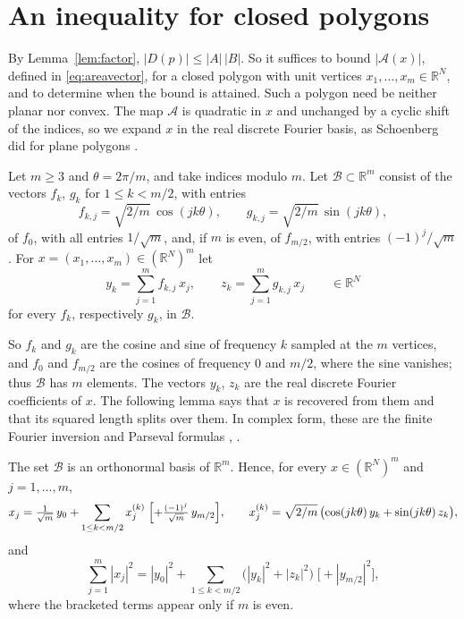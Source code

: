 \section{An inequality for closed polygons}
\label{sec:polygon}

By Lemma~\ref{lem:factor}, $|D(p)| \leq |A|\,|B|$. So it suffices to bound
$|\mathcal{A}(x)|$, defined in \eqref{eq:areavector}, for a closed polygon
with unit vertices $x_{1}, \ldots, x_{m} \in \mathbb{R}^{N}$, and to determine
when the bound is attained. Such a polygon need be neither planar nor convex.
The map $\mathcal{A}$ is quadratic in $x$ and unchanged by a cyclic shift of
the indices, so we expand $x$ in the real discrete Fourier basis, as
Schoenberg did for plane polygons \cite{schoenberg-1950}.

\begin{notation}
  Let $m \geq 3$ and $\theta = 2\pi/m$, and take indices modulo $m$. Let
  $\mathcal{B} \subset \mathbb{R}^{m}$ consist of the vectors $f_{k}$,
  $g_{k}$ for $1 \leq k < m/2$, with entries
  \[
    f_{k,j} = \sqrt{2/m}\,\cos(jk\theta), \qquad
    g_{k,j} = \sqrt{2/m}\,\sin(jk\theta),
  \]
  of $f_{0}$, with all entries $1/\sqrt{m}$, and, if $m$ is even, of
  $f_{m/2}$, with entries $(-1)^{j}/\sqrt{m}$. For $x = (x_{1}, \ldots,
  x_{m}) \in (\mathbb{R}^{N})^{m}$ let
  \[
    y_{k} = \sum_{j=1}^{m} f_{k,j}\, x_{j}, \qquad
    z_{k} = \sum_{j=1}^{m} g_{k,j}\, x_{j} \qquad \in \mathbb{R}^{N}
  \]
  for every $f_{k}$, respectively $g_{k}$, in $\mathcal{B}$.
\end{notation}

So $f_{k}$ and $g_{k}$ are the cosine and sine of frequency $k$ sampled at
the $m$ vertices, and $f_{0}$ and $f_{m/2}$ are the cosines of frequency $0$
and $m/2$, where the sine vanishes; thus $\mathcal{B}$ has $m$ elements. The
vectors $y_{k}$, $z_{k}$ are the real discrete Fourier coefficients of $x$.
The following lemma says that $x$ is recovered from them and that its
squared length splits over them. In complex form, these are the finite
Fourier inversion and Parseval formulas
\cite[Chapter~7, Section~1]{stein-shakarchi-2003},
\cite[Section~1]{schoenberg-1950}.

\begin{lemma}
  \label{lem:dftbasis}
  The set $\mathcal{B}$ is an orthonormal basis of $\mathbb{R}^{m}$. Hence,
  for every $x \in (\mathbb{R}^{N})^{m}$ and $j = 1, \ldots, m$,
  \begin{equation}
    \label{eq:expansion}
    x_{j} = \tfrac{1}{\sqrt{m}}\, y_{0}
      + \sum_{1 \leq k < m/2} x^{(k)}_{j}
      \;\Bigl[ + \tfrac{(-1)^{j}}{\sqrt{m}}\, y_{m/2} \Bigr],
    \qquad
    x^{(k)}_{j} = \sqrt{2/m}\,\bigl(\cos(jk\theta)\, y_{k}
      + \sin(jk\theta)\, z_{k}\bigr),
  \end{equation}
  and
  \begin{equation}
    \label{eq:parseval}
    \sum_{j=1}^{m} |x_{j}|^{2} = |y_{0}|^{2}
      + \sum_{1 \leq k < m/2} \bigl(|y_{k}|^{2} + |z_{k}|^{2}\bigr)
      \;\bigl[ + |y_{m/2}|^{2} \bigr],
  \end{equation}
  where the bracketed terms appear only if $m$ is even.
\end{lemma}

